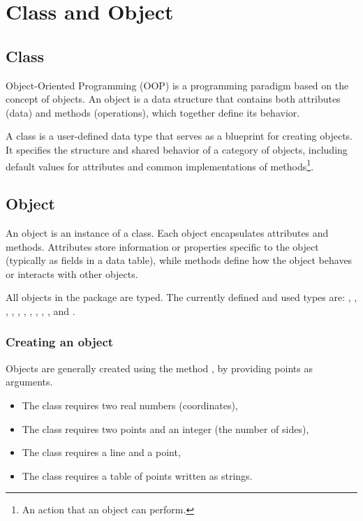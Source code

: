 \newpage

\section{Class and Object}
\label{sec:class_and_object}

\subsection{Class}

Object-Oriented Programming (OOP) is a programming paradigm based on the concept of objects. An object is a data structure that contains both attributes (data) and methods (operations), which together define its behavior.

\vspace{1em}
A class is a user-defined data type that serves as a blueprint for creating objects. It specifies the structure and shared behavior of a category of objects, including default values for attributes and common implementations of methods\footnote{An action that an object can perform.}.

\subsection{Object}
An object is an instance of a class. Each object encapsulates attributes and methods. Attributes store information or properties specific to the object (typically as fields in a data table), while methods define how the object behaves or interacts with other objects.


\vspace{1em}
 All objects in the package are typed. The currently defined and used types are: , , , , , , , , ,  ,  and .


\subsubsection{Creating an object}
Objects are generally created using the method , by providing points as arguments.

\begin{itemize}
  \item The  class requires two real numbers (coordinates),
  \item The  class requires two points and an integer (the number of sides),
  \item The  class requires a line and a point,
  \item The  class requires a table of points written as strings.
\end{itemize}

